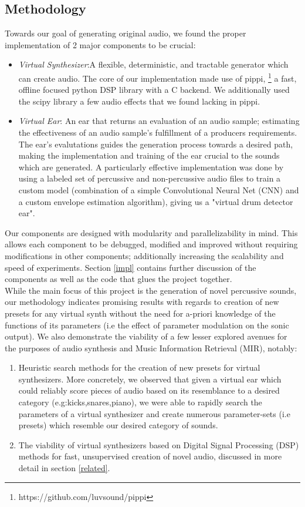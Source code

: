 \documentclass{nime-alternate} %
\begin{document}
\subsection{Methodology}
Towards our goal of generating original audio, we found the proper implementation of 2 major components to be crucial:
\begin{itemize}
    \item \textit{Virtual Synthesizer}:A flexible, deterministic, and tractable generator which can create audio. The core of our implementation made use of pippi, \footnote{https://github.com/luvsound/pippi} a fast, offline focused python DSP library with a C backend. We additionally used the scipy \cite{jones2001scipy} library a few audio effects that we found lacking in pippi. 
    \item \textit{Virtual Ear}: An ear that returns an evaluation of an audio sample; estimating the effectiveness of an audio sample's fulfillment of a producers requirements. The ear's evalutations guides the generation process towards a desired path, making the implementation and training of the ear crucial to the sounds which are generated. A particularly effective implementation was done by using a labeled set of percussive and non-percussive audio files to train a custom model (combination of a simple Convolutional Neural Net (CNN) and a custom envelope estimation algorithm), giving us a "virtual drum detector ear". \\
\end{itemize}
Our components are designed with modularity and parallelizability in mind. This allows each component to be debugged, modified and improved without requiring modifications in other components; additionally increasing the scalability and speed of experiments.
Section \ref{impl} contains further discussion of the components as well as the code that glues the project together.\\ 
While the main focus of this project is the generation of novel percussive sounds, our methodology indicates promising results with regards to creation of new presets for any virtual synth without the need for a-priori knowledge of the functions of its parameters (i.e the effect of parameter modulation on the sonic output). We also demonstrate the viability of a few lesser explored avenues for the purposes of audio synthesis and Music Information Retrieval (MIR), notably:
\begin{enumerate}[label=\roman*]
\item Heuristic search methods for the creation of new presets for virtual synthesizers. More concretely, we observed that given a virtual ear which could reliably score pieces of audio based on its resemblance to a desired category (e.g:kicks,snares,piano), we were able to rapidly search the parameters of a virtual synthesizer and create numerous parameter-sets (i.e presets) which resemble our desired category of sounds.
\item The viability of virtual synthesizers based on Digital Signal Processing (DSP) methods for fast, unsupervised creation of novel audio, discussed in more detail in section \ref{related}. \\
\end{enumerate}
\end{document}
